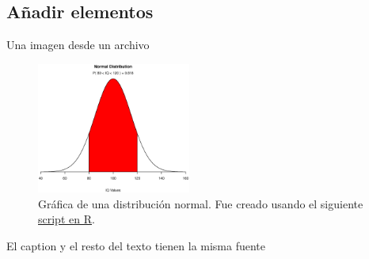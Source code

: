 \subsection{Añadir elementos}
\begin{frame}{Una imagen desde un archivo}
\begin{figure}[htb]
  \centering
  \includegraphics[width=0.45\textwidth]{img/normal}
\caption[Distribución normal]{Gráfica de una distribución normal. Fue creado usando el siguiente \href{https://www.statmethods.net/advgraphs/probability.html}{script en R}.}
\end{figure}
El caption y el resto del texto tienen la misma fuente
\end{frame}

